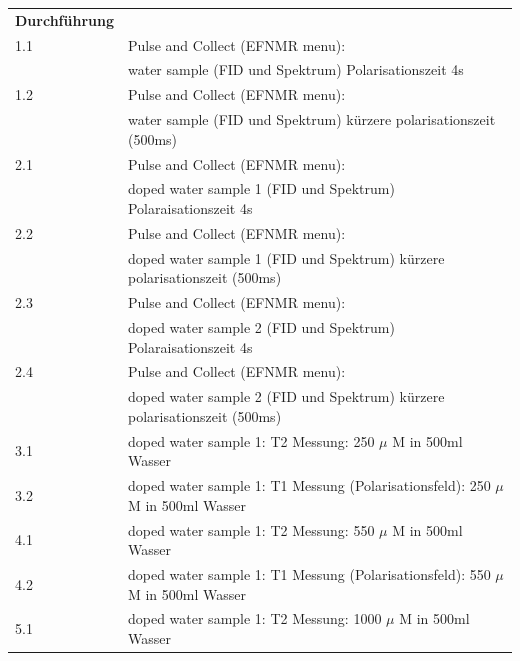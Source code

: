 
\vspace{0.5cm}


 \begin{tabular}{ll}   
    \textbf{Durchführung} & \\
           1.1 & Pulse and Collect (EFNMR menu): \\
           & water sample (FID und Spektrum) Polarisationszeit 4s \\
    
           1.2 & Pulse and Collect (EFNMR menu): \\
           & water sample (FID und Spektrum) kürzere polarisationszeit (500ms) \\
    
           2.1 & Pulse and Collect (EFNMR menu): \\
           & doped water sample 1 (FID und Spektrum) Polaraisationszeit 4s \\
    
           2.2 & Pulse and Collect (EFNMR menu): \\
           &doped water sample 1 (FID und Spektrum) kürzere polarisationszeit (500ms) \\

           2.3 & Pulse and Collect (EFNMR menu): \\
           & doped water sample 2 (FID und Spektrum) Polaraisationszeit 4s \\
    
           2.4 & Pulse and Collect (EFNMR menu): \\
           & doped water sample 2 (FID und Spektrum) kürzere polarisationszeit (500ms) \\ 

           3.1 & doped water sample 1: T2 Messung: 250 $\mu$ M in 500ml Wasser \\
    
           3.2 & doped water sample 1: T1 Messung (Polarisationsfeld): 250 $\mu$ M in 500ml Wasser \\
    
           4.1 & doped water sample 1: T2 Messung: 550 $\mu$ M in 500ml Wasser \\
    
           4.2 & doped water sample 1: T1 Messung (Polarisationsfeld): 550 $\mu$ M in 500ml Wasser \\

           5.1 & doped water sample 1: T2 Messung: 1000 $\mu$ M in 500ml Wasser \\
    

\end{tabular}

